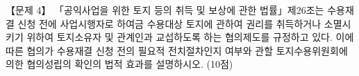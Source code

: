 \begin{longquestion}{【문제 4】}
「공익사업을 위한 토지 등의 취득 및 보상에 관한 법률」제26조는 수용재결 신청 전에 사업시행자로 하여금 수용대상 토지에 관하여 권리를 취득하거나 소멸시키기 위하여 토지소유자 및 관계인과 교섭하도록 하는 협의제도를 규정하고 있다. 이에 따른 협의가 수용재결 신청 전의 필요적 전치절차인지 여부와 관할 토지수용위원회에 의한 협의성립의 확인의 법적 효과를 설명하시오. (10점) \par
\end{longquestion}

